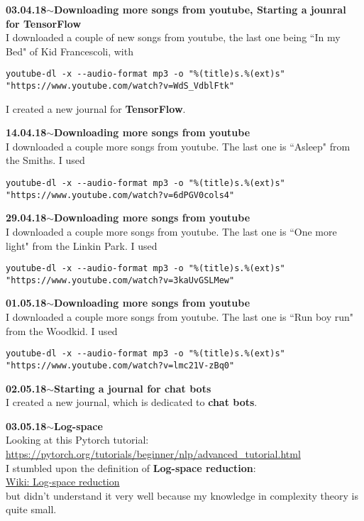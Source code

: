 \documentclass[11pt,a4paper]{article}
\newenvironment{loggentry}[2]%
{\noindent\textbf{#1}\hspace{1cm}$\mathbf{\sim}$\text{ }\textbf{#2}\\}{\vspace{0.5cm}}
\begin{document}
\begin{loggentry}{03.04.18}{Downloading more songs from youtube, Starting a jounral for TensorFlow}
I downloaded a couple of new songs from youtube, the last one being ``In my Bed" of Kid Francescoli, with
\begin{verbatim}
youtube-dl -x --audio-format mp3 -o "%(title)s.%(ext)s" "https://www.youtube.com/watch?v=WdS_VdblFtk"
\end{verbatim}
I created a new journal for \textbf{TensorFlow}.
\end{loggentry}

\begin{loggentry}{14.04.18}{Downloading more songs from youtube}
I downloaded a couple more songs from youtube. The last one is ``Asleep" from the Smiths. I used
\begin{verbatim}
youtube-dl -x --audio-format mp3 -o "%(title)s.%(ext)s" "https://www.youtube.com/watch?v=6dPGV0cols4"
\end{verbatim}
\end{loggentry}

\begin{loggentry}{29.04.18}{Downloading more songs from youtube}
I downloaded a couple more songs from youtube. The last one is ``One more light" from the Linkin Park. I used
\begin{verbatim}
youtube-dl -x --audio-format mp3 -o "%(title)s.%(ext)s" "https://www.youtube.com/watch?v=3kaUvGSLMew"
\end{verbatim}
\end{loggentry}

\begin{loggentry}{01.05.18}{Downloading more songs from youtube}
I downloaded a couple more songs from youtube. The last one is ``Run boy run" from the Woodkid. I used
\begin{verbatim}
youtube-dl -x --audio-format mp3 -o "%(title)s.%(ext)s" "https://www.youtube.com/watch?v=lmc21V-zBq0"
\end{verbatim}
\end{loggentry}

\begin{loggentry}{02.05.18}{Starting a journal for chat bots}
I created a new journal, which is dedicated to \textbf{chat bots}.
\end{loggentry}

\begin{loggentry}{03.05.18}{Log-space}
Looking at this Pytorch tutorial:\\
\url{https://pytorch.org/tutorials/beginner/nlp/advanced_tutorial.html}\\
I stumbled upon the definition of \textbf{Log-space reduction}:\\
\href{https://en.wikipedia.org/wiki/Log-space_reduction}{Wiki: Log-space reduction}\\
but didn't understand it very well because my knowledge in complexity theory is quite small.
\end{loggentry}
\end{document}
